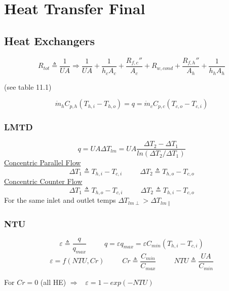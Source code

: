 \documentclass[twocolumn, 12pt]{article}
\begin{document}
\small

\section*{Heat Transfer Final}

\subsection*{Heat Exchangers}

\begin{equation*}
    R_{tot} \triangleq \frac{1}{UA} \Rightarrow \frac{1}{UA} + \frac{1}{h_cA_c} + \frac{R_{f,c}''}{A_c} + R_{w,cond} + \frac{R_{f,h}''}{A_h} + \frac{1}{h_hA_h}
\end{equation*}
\begin{center}
    (see table 11.1)
\end{center}
\begin{equation*}
    \Dot{m}_h C_{p,h} (T_{h,i} -T_{h,o}) = q = \Dot{m}_c C_{p,c} (T_{c,o} -T_{c,i})
\end{equation*}

\subsubsection*{LMTD}
\begin{equation*}
    q = UA \Delta T_{lm} = UA \frac{\Delta T_2 - \Delta T_1}{ln\left(\Delta T_2 / \Delta T_1 \right)}  
\end{equation*}
\underline{Concentric Parallel Flow}
\begin{equation*}
    \Delta T_1 \triangleq T_{h,i} - T_{c,i} \hspace{30pt} \Delta T_2 \triangleq T_{h,o} - T_{c,o}
\end{equation*}
\underline{Concentric Counter Flow}
\begin{equation*}
    \Delta T_1 \triangleq T_{h,o} - T_{c,i} \hspace{30pt} \Delta T_2 \triangleq T_{h,i} - T_{c,o}
\end{equation*}
\noindent
For the same inlet and outlet temps \(\Delta T_{lm\perp} > \Delta T_{lm \parallel}\)


\subsubsection*{NTU}
\begin{equation*}
    \varepsilon \triangleq \frac{q}{q_{max}} \hspace{30pt} q = \varepsilon q_{max} = \varepsilon C_{min} (T_{h,i} - T_{c,i})
\end{equation*}
\begin{equation*}
    \varepsilon  = f(NTU, Cr) \hspace{30pt} Cr \triangleq \frac{C_{min}}{C_{max}} \hspace{30pt} NTU \triangleq \frac{UA}{C_{min}}
\end{equation*}
\begin{center}
    For \(Cr=0\) (all HE)    \(\Rightarrow\hspace{10pt}\varepsilon = 1 -exp(-NTU)\)
\end{center}
\end{document}
